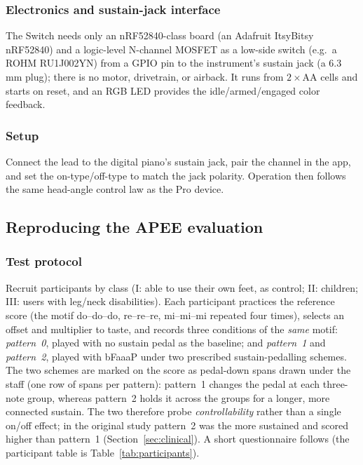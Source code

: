 \subsubsection{Electronics and sustain-jack interface}
\label{sec:impl-switch-elec}
The Switch needs only an nRF52840-class board (an Adafruit ItsyBitsy nRF52840) and
a logic-level N-channel MOSFET as a low-side switch (e.g.\ a ROHM RU1J002YN) from a
GPIO pin to the instrument's sustain jack (a 6.3\,mm plug); there is no motor,
drivetrain, or airback. It runs from $2\times$AA cells and starts on reset, and an
RGB LED provides the idle/armed/engaged color feedback.

\subsubsection{Setup}
\label{sec:impl-switch-setup}
Connect the lead to the digital piano's sustain jack, pair the channel in the
app, and set the on-type/off-type to match the jack polarity. Operation then
follows the same head-angle control law as the Pro device.

\subsection{Reproducing the APEE evaluation}
\label{sec:impl-apee}

\subsubsection{Test protocol}
\label{sec:impl-apee-protocol}
Recruit participants by class (I: able to use their own feet, as control; II:
children; III: users with leg/neck disabilities). Each participant practices the
reference score (the motif do--do--do, re--re--re, mi--mi--mi repeated four
times), selects an offset and multiplier to taste, and records three conditions
of the \emph{same} motif: \emph{pattern~0}, played with no sustain pedal as the
baseline; and \emph{pattern~1} and \emph{pattern~2}, played with bFaaaP under two
prescribed sustain-pedalling schemes. The two schemes are marked on the score as
pedal-down spans drawn under the staff (one row of spans per pattern): pattern~1
changes the pedal at each three-note group, whereas pattern~2 holds it across the
groups for a longer, more connected sustain. The two therefore probe
\emph{controllability} rather than a single on/off effect; in the original study
pattern~2 was the more sustained and scored higher than pattern~1
(Section~\ref{sec:clinical}). A short questionnaire follows (the participant
table is Table~\ref{tab:participants}).

